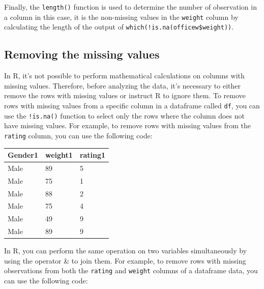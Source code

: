 \documentclass[
]{article}
\newenvironment{Shaded}{\begin{snugshade}}{\end{snugshade}}
\newcommand{\FunctionTok}[1]{\textcolor[rgb]{0.13,0.29,0.53}{\textbf{#1}}}
\newcommand{\NormalTok}[1]{#1}
\newcommand{\OtherTok}[1]{\textcolor[rgb]{0.56,0.35,0.01}{#1}}
\newcommand{\SpecialCharTok}[1]{\textcolor[rgb]{0.81,0.36,0.00}{\textbf{#1}}}
\begin{document}
Finally, the \texttt{length()} function is used to determine the number
of observation in a column in this case, it is the non-missing values in
the \texttt{weight} column by calculating the length of the output of
\texttt{which(!is.na(officew\$weight))}.

\hypertarget{removing-the-missing-values}{%
\subsection{Removing the missing
values}\label{removing-the-missing-values}}

In R, it's not possible to perform mathematical calculations on columns
with missing values. Therefore, before analyzing the data, it's
necessary to either remove the rows with missing values or instruct R to
ignore them. To remove rows with missing values from a specific column
in a dataframe called \texttt{df}, you can use the \texttt{!is.na()}
function to select only the rows where the column does not have missing
values. For example, to remove rows with missing values from the
\texttt{rating} column, you can use the following code:

\begin{Shaded}
\end{Shaded}

\begin{longtable}[]{@{}lll@{}}
\toprule\noalign{}
Gender1 & weight1 & rating1 \\
\midrule\noalign{}
\endhead
\bottomrule\noalign{}
\endlastfoot
Male & 89 & 5 \\
Male & 75 & 1 \\
Male & 88 & 2 \\
Male & 75 & 4 \\
Male & 49 & 9 \\
Male & 89 & 9 \\
\end{longtable}

In R, you can perform the same operation on two variables simultaneously
by using the operator \& to join them. For example, to remove rows with
missing observations from both the \texttt{rating} and \texttt{weight}
columns of a dataframe data, you can use the following code:
\end{document}
